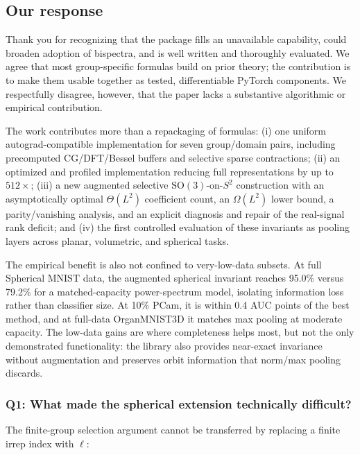 \documentclass[10pt]{article}
\begin{document}
\subsection{Our response}

Thank you for recognizing that the package fills an unavailable capability,
could broaden adoption of bispectra, and is well written and thoroughly
evaluated. We agree that most group-specific formulas build on prior theory;
the contribution is to make them usable together as tested, differentiable
PyTorch components. We respectfully disagree, however, that the paper lacks a
substantive algorithmic or empirical contribution.

The work contributes more than a repackaging of formulas: (i) one uniform
autograd-compatible implementation for seven group/domain pairs, including
precomputed CG/DFT/Bessel buffers and selective sparse contractions; (ii) an
optimized and profiled implementation reducing full representations by up to
$512\times$; (iii) a new augmented selective $\mathrm{SO}(3)$-on-$S^2$
construction with an asymptotically optimal $\Theta(L^2)$ coefficient count,
an $\Omega(L^2)$ lower bound, a parity/vanishing analysis, and an explicit
diagnosis and repair of the real-signal rank deficit; and (iv) the first
controlled evaluation of these invariants as pooling layers across planar,
volumetric, and spherical tasks.

The empirical benefit is also not confined to very-low-data subsets. At full
Spherical MNIST data, the augmented spherical invariant reaches 95.0\% versus
79.2\% for a matched-capacity power-spectrum model, isolating information
loss rather than classifier size. At 10\% PCam, it is within 0.4 AUC points
of the best method, and at full-data OrganMNIST3D it matches max pooling at
moderate capacity. The low-data gains are where completeness helps most, but
not the only demonstrated functionality: the library also provides near-exact
invariance without augmentation and preserves orbit information that norm/max
pooling discards.

\subsubsection*{Q1: What made the spherical extension technically difficult?}

The finite-group selection argument cannot be transferred by replacing a
finite irrep index with $\ell$:
\end{document}
